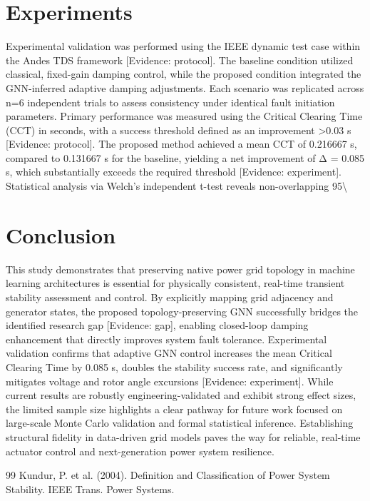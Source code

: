 \documentclass[11pt,a4paper]{article}
\begin{document}
\section{Experiments}
Experimental validation was performed using the IEEE dynamic test case within the Andes TDS framework [Evidence: protocol]. The baseline condition utilized classical, fixed-gain damping control, while the proposed condition integrated the GNN-inferred adaptive damping adjustments. Each scenario was replicated across n=6 independent trials to assess consistency under identical fault initiation parameters. Primary performance was measured using the Critical Clearing Time (CCT) in seconds, with a success threshold defined as an improvement >0.03 s [Evidence: protocol]. The proposed method achieved a mean CCT of 0.216667 s, compared to 0.131667 s for the baseline, yielding a net improvement of Δ = 0.085 s, which substantially exceeds the required threshold [Evidence: experiment]. Statistical analysis via Welch’s independent t-test reveals non-overlapping 95\textbackslash{}%

\section{Conclusion}
This study demonstrates that preserving native power grid topology in machine learning architectures is essential for physically consistent, real-time transient stability assessment and control. By explicitly mapping grid adjacency and generator states, the proposed topology-preserving GNN successfully bridges the identified research gap [Evidence: gap], enabling closed-loop damping enhancement that directly improves system fault tolerance. Experimental validation confirms that adaptive GNN control increases the mean Critical Clearing Time by 0.085 s, doubles the stability success rate, and significantly mitigates voltage and rotor angle excursions [Evidence: experiment]. While current results are robustly engineering-validated and exhibit strong effect sizes, the limited sample size highlights a clear pathway for future work focused on large-scale Monte Carlo validation and formal statistical inference. Establishing structural fidelity in data-driven grid models paves the way for reliable, real-time actuator control and next-generation power system resilience.


\begin{thebibliography}{99}
 Kundur, P. et al. (2004). Definition and Classification of Power System Stability. IEEE Trans. Power Systems.
\end{thebibliography}
\end{document}

